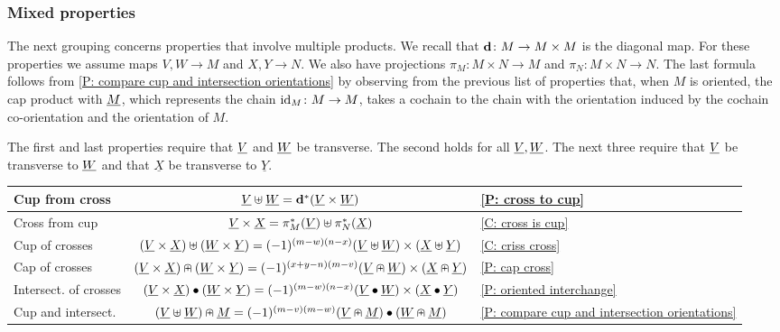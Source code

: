 \subsubsection{Mixed properties}\label{S: mixed formulas}

The next grouping concerns properties that involve multiple products.
We recall that $\mathbf{d} \colon M \to M \times M$ is the diagonal map.
For these properties we assume maps $V,W \to M$ and $X,Y \to N$.
We also have projections $\pi_M \colon M \times N \to M$ and $\pi_N \colon M \times N \to N$.
The last formula follows from \cref{P: compare cup and intersection orientations} by observing from the previous list of properties that, when $M$ is oriented, the cap product with $\underline{M}$, which represents the chain $\mathrm{id}_M \colon M \to M$, takes a cochain to the chain with the orientation induced by the cochain co-orientation and the orientation of $M$.

The first and last properties require that $\underline{V}$ and $\underline{W}$ be transverse.
The second holds for all $\underline{V}, \underline{W}$.
The next three require that $\underline{V}$ be transverse to $\underline{W}$ and that $\underline{X}$ be transverse to $\underline{Y}$.

\smallskip
\begin{center}
	\begin{tabular}{|l|c|l|}
		\hline
		Cup from cross& $\underline{V}\uplus \underline{W} = \mathbf{d}^*(\underline{V} \times \underline{W})$&\ref{P: cross to cup}	\\
		\hline
		Cross from cup&$\underline{V} \times \underline{X} = \pi_M^*(\underline{V})\uplus\pi_N^*(\underline{X})$& \ref{C: cross is cup}	\\
		\hline
		Cup of crosses&$(\underline{V} \times \underline{X})\uplus (\underline{W} \times \underline{Y}) = (-1)^{(m-w)(n-x)} (\underline{V}\uplus \underline{W}) \times (\underline{X}\uplus \underline{Y})$ &	\ref{C: criss cross}\\
		\hline
		Cap of crosses &$(\underline{V} \times \underline{X})\nplus (\underline{W} \times \underline{Y}) = (-1)^{(x+y-n)(m-v)} (\underline{V} \nplus \underline{W}) \times (\underline{X}\nplus \underline{Y})$ & \ref{P: cap cross}\\
		\hline
		Intersect. of crosses &$(\underline{V} \times \underline{X})\bullet (\underline{W} \times \underline{Y}) = (-1)^{(m-w)(n-x)}(\underline{V}\bullet \underline{W}) \times (\underline{X}\bullet \underline{Y})$&\ref{P: oriented interchange}\\
		\hline
		Cup and intersect. &$(\underline{V}\uplus \underline{W})\nplus \underline{M} = (-1)^{(m-v)(m-w)}(\underline{V}\nplus \underline{M})\bullet(\underline{W}\nplus \underline{M})$&\ref{P: compare cup and intersection orientations}\\
		\hline
	\end{tabular}
\end{center}

